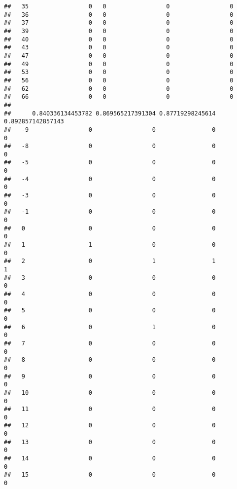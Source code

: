 \documentclass[]{article}
\begin{document}
\begin{verbatim}
##   35                 0   0                 0                 0
##   36                 0   0                 0                 0
##   37                 0   0                 0                 0
##   39                 0   0                 0                 0
##   40                 0   0                 0                 0
##   43                 0   0                 0                 0
##   47                 0   0                 0                 0
##   49                 0   0                 0                 0
##   53                 0   0                 0                 0
##   56                 0   0                 0                 0
##   62                 0   0                 0                 0
##   66                 0   0                 0                 0
##     
##      0.840336134453782 0.869565217391304 0.87719298245614 0.892857142857143
##   -9                 0                 0                0                 0
##   -8                 0                 0                0                 0
##   -5                 0                 0                0                 0
##   -4                 0                 0                0                 0
##   -3                 0                 0                0                 0
##   -1                 0                 0                0                 0
##   0                  0                 0                0                 0
##   1                  1                 0                0                 0
##   2                  0                 1                1                 1
##   3                  0                 0                0                 0
##   4                  0                 0                0                 0
##   5                  0                 0                0                 0
##   6                  0                 1                0                 0
##   7                  0                 0                0                 0
##   8                  0                 0                0                 0
##   9                  0                 0                0                 0
##   10                 0                 0                0                 0
##   11                 0                 0                0                 0
##   12                 0                 0                0                 0
##   13                 0                 0                0                 0
##   14                 0                 0                0                 0
##   15                 0                 0                0                 0

\end{verbatim}
\end{document}
